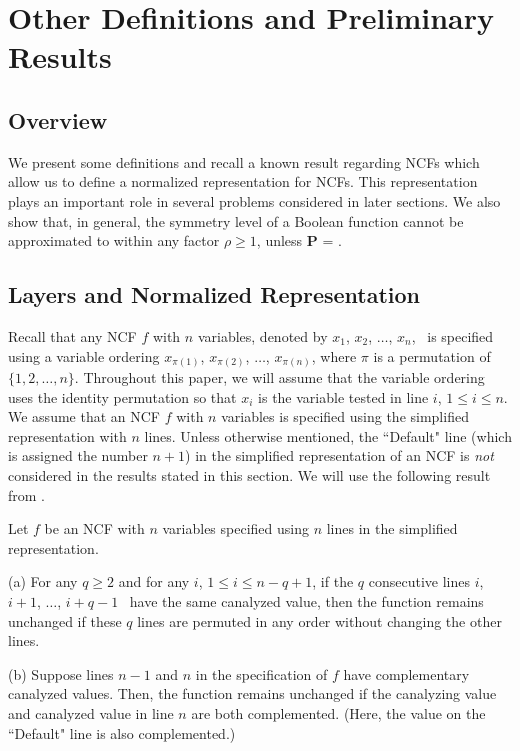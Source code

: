 \section{Other Definitions and Preliminary Results}
\label{sec:prelim}

\subsection{Overview}

We present some definitions and recall
a known result regarding NCFs which allow us
to define a normalized representation for NCFs.
This representation plays an important role in several
problems considered in later sections.
We also show that, in general, the symmetry level
of a Boolean function cannot be approximated to within any
factor $\rho \geq 1$, unless \textbf{P} = \cnp.

\medskip

\subsection{Layers and Normalized Representation}
\label{sse:ncf_layer}

Recall that any NCF $f$ with $n$ variables,
denoted by $x_1$, $x_2$, $\ldots$, $x_n$,~
is specified using a variable ordering 
$x_{\pi(1)}$, $x_{\pi(2)}$, $\ldots$,  $x_{\pi(n)}$,
where $\pi$ is a permutation of $\{1, 2, \ldots, n\}$.
Throughout this paper, we will assume that the variable
ordering uses the identity permutation so that $x_i$ is the 
variable tested in line $i$, $1 \leq i \leq n$. 
We assume that an NCF $f$ with $n$
variables is specified using the simplified representation with $n$ lines. 
Unless otherwise mentioned, the ``Default" line (which is assigned the number $n+1$)
in the simplified representation of an NCF is \emph{not} considered
in the results stated in this section.
We will use the following result from \cite{Stearns-etal-2018}.

\begin{observation} \label{obs:ncf_transformations}
Let $f$ be an NCF with $n$ variables specified using $n$ lines
in the simplified representation. 
\begin{description}
\item{(a)} 
For any $q \geq 2$ and for any $i$, $1 \leq i \leq n-q+1$,
if the $q$ consecutive lines $i$, $i+1$, $\ldots$, $i+q-1$~
have the same canalyzed value, then the function remains
unchanged if these $q$ lines are permuted in any order
without changing the other lines.

\item{(b)} 
Suppose lines $n-1$ and $n$ in the specification of $f$ 
have complementary canalyzed values.
Then, the function remains unchanged 
if the canalyzing value and canalyzed value in line $n$
are both complemented. 
(Here, the value on the ``Default" line is also complemented.)
\QED
\end{description}
\end{observation}

